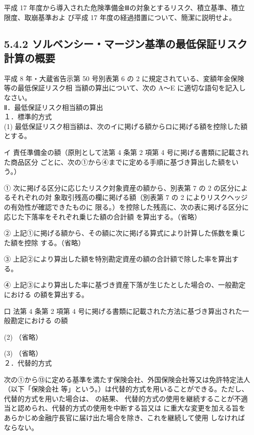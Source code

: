 \documentclass[report,gutter=10mm,fore-edge=10mm,uplatex,dvipdfmx]{jlreq}
\begin{document}
平成 17 年度から導入された危険準備金Ⅲの対象とするリスク、積立基準、積立限度、取崩基準およ
び平成 17 年度の経過措置について、簡潔に説明せよ。


\subsection{5.4.2 ソルベンシー・マージン基準の最低保証リスク計算の概要}
平成 8 年・大蔵省告示第 50 号別表第 6 の 2 に規定されている、変額年金保険等の最低保証リスク相
当額の算出について、次の A～E に適切な語句を記入しなさい。\\
Ⅱ．最低保証リスク相当額の算出\\
１．標準的方式\\
(1) 最低保証リスク相当額は、次のイに掲げる額からロに掲げる額を控除した額とする。

イ  責任準備金の額（原則として法第 4 条第 2 項第 4 号に掲げる書類に記載された商品区分
ごとに、次の①から④までに定める手順に基づき算出した額をいう。）

① 次に掲げる区分に応じたリスク対象資産の額から、別表第 7 の 2 の区分によるそれぞれの対
象取引残高の欄に掲げる額（別表第 7 の 2 によりリスクヘッジの有効性が確認できたものに
限る。）を控除した残高に、次の表に掲げる区分に応じた下落率をそれぞれ乗じた額の合計額
を算出する。（省略）

② 上記①に掲げる額から、その額に次に掲げる算式により計算した係数を乗じた額を控除
する。（省略）

③ 上記②により算出した額を特別勘定資産の額の合計額で除した率を算出する。

④ 上記③により算出した率に基づき資産下落が生じたとした場合の、一般勘定における
の額を算出する。

口 法第 4 条第 2 項第 4 号に掲げる書類に記載された方法に基づき算出された一般勘定における
の額

(2) （省略）

(3) （省略）\\
２．代替的方式

次の①から⑬に定める基準を満たす保険会社、外国保険会社等又は免許特定法人（以下「保険会社
等」という。）は代替的方式を用いることができる。ただし、代替的方式を用いた場合は、
の結果、
代替的方式の使用を継続することが不適当と認められ、代替的方式の使用を中断する旨又は
に重大な変更を加える旨をあらかじめ金融庁長官に届け出た場合を除き、これを継続して使用
しなければならない。
\end{document}
